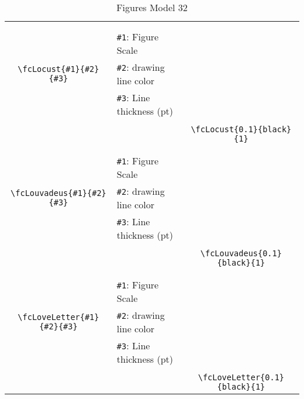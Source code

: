 \documentclass[x11names]{article}
\begin{document}
\begin{table}[H]
\begin{tabular}{|c|l|c|}
	&&\multirow{5}{*}{\fcLocust{0.1}{black}{1}}\\	&&\\	&\verb|#1|: Figure Scale &\\	\verb|\fcLocust{#1}{#2}{#3}|&	\verb|#2|: drawing line color &\\	&\verb|#3|: Line thickness (pt) &\\ &&\\&&	\verb|\fcLocust{0.1}{black}{1}|\\\hline 	
	&&\multirow{5}{*}{\fcLouvadeus{0.1}{black}{1}}\\	&&\\	&\verb|#1|: Figure Scale &\\	\verb|\fcLouvadeus{#1}{#2}{#3}|&	\verb|#2|: drawing line color &\\	&\verb|#3|: Line thickness (pt) &\\ &&\\&&	\verb|\fcLouvadeus{0.1}{black}{1}|\\\hline 	
	&&\multirow{5}{*}{\fcLoveLetter{0.1}{black}{1}}\\	&&\\	&\verb|#1|: Figure Scale &\\	\verb|\fcLoveLetter{#1}{#2}{#3}|&	\verb|#2|: drawing line color &\\	&\verb|#3|: Line thickness (pt) &\\ &&\\&&	\verb|\fcLoveLetter{0.1}{black}{1}|\\\hline 	\hline\end{tabular}\caption{Figures Model 32}\label{tab32}\end{table}
\end{document}
